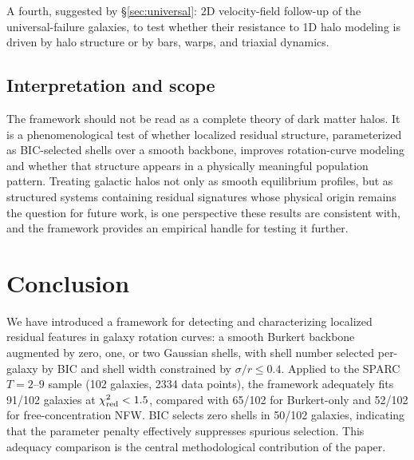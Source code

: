 \documentclass[linenumbers]{aastex701}
\newcommand{\chired}{\chi^2_{\rm red}}
\begin{document}
A fourth, suggested by \S\ref{sec:universal}: 2D velocity-field follow-up of the universal-failure galaxies, to test whether their resistance to 1D halo modeling is driven by halo structure or by bars, warps, and triaxial dynamics.

\subsection{Interpretation and scope}

The framework should not be read as a complete theory of dark matter halos. It is a phenomenological test of whether localized residual structure, parameterized as BIC-selected shells over a smooth backbone, improves rotation-curve modeling and whether that structure appears in a physically meaningful population pattern. Treating galactic halos not only as smooth equilibrium profiles, but as structured systems containing residual signatures whose physical origin remains the question for future work, is one perspective these results are consistent with, and the framework provides an empirical handle for testing it further.


\section{Conclusion}\label{sec:conclusion}

We have introduced a framework for detecting and characterizing localized residual features in galaxy rotation curves: a smooth Burkert backbone augmented by zero, one, or two Gaussian shells, with shell number selected per-galaxy by BIC and shell width constrained by $\sigma/r \le 0.4$. Applied to the SPARC $T=2$--$9$ sample (102 galaxies, 2334 data points), the framework adequately fits 91/102 galaxies at $\chired < 1.5$, compared with 65/102 for Burkert-only and 52/102 for free-concentration NFW. BIC selects zero shells in 50/102 galaxies, indicating that the parameter penalty effectively suppresses spurious selection. This adequacy comparison is the central methodological contribution of the paper.
\end{document}
